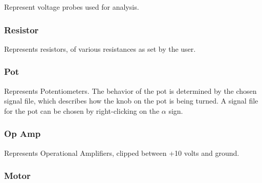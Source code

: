 \documentclass[12pt]{amsart}
\begin{document}

Represent voltage probes used for analysis.

\subsubsection{Resistor}


Represents resistors, of various resistances as set by the user.

\subsubsection{Pot}


Represents Potentiometers. The behavior of the pot is determined by the chosen signal file, which describes how the knob on the pot is being turned. A signal file for the pot can be chosen by right-clicking on the $\alpha$ sign.

\subsubsection{Op Amp}


Represents Operational Amplifiers, clipped between +10 volts and ground.

\subsubsection{Motor}
\end{document}
